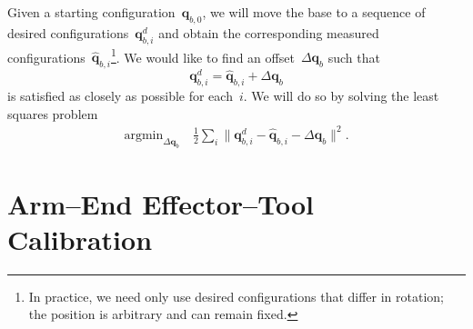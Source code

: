 \documentclass{article}
\DeclareMathOperator*{\argmin}{argmin}
\begin{document}
Given a starting configuration~$\bm{q}_{b,0}$, we will move the base to a
sequence of desired configurations~$\bm{q}^d_{b,i}$ and obtain the
corresponding measured configurations~$\hat{\bm{q}}_{b,i}$\footnote{In
practice, we need only use desired configurations that differ in rotation; the
position is arbitrary and can remain fixed.}. We would like to find an
offset~$\Delta\bm{q}_b$ such that
\begin{equation}
  \bm{q}^d_{b,i} = \hat{\bm{q}}_{b,i} + \Delta\bm{q}_b
\end{equation}
is satisfied as closely as possible for each~$i$. We will do so by solving the
least squares problem
\begin{equation}\label{eq:contact_force_formulation}
  \begin{aligned}
    \argmin_{\Delta\bm{q}_b}\ & \frac{1}{2}\sum_i\|\bm{q}^d_{b,i} - \hat{\bm{q}}_{b,i} - \Delta\bm{q}_b\|^2.
  \end{aligned}
\end{equation}


\section{Arm--End Effector--Tool Calibration}
\end{document}
